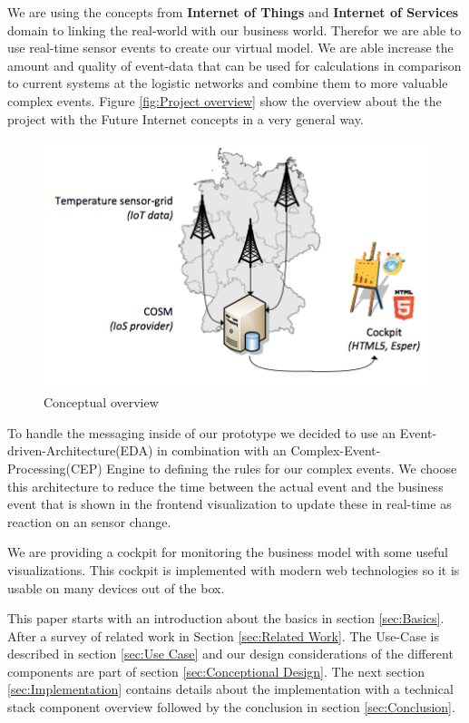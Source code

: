 \documentclass{acm_proc_article-sp}
\begin{document}
We are using the concepts from \textbf{Internet of Things} and \textbf{Internet of Services} domain to linking the real-world with our business world. Therefor we are able to use real-time sensor events to create our virtual model. We are able increase the amount and quality of event-data that can be used for calculations in comparison to current systems at the logistic networks and combine them to more valuable complex events.
Figure \ref{fig:Project overview} show the overview about the the project with the Future Internet concepts in a very general way. 

\begin{figure}[h]
	\begin{center}
		\includegraphics[scale=0.5]{overview.png}
		\caption[Conceptual overview]{Conceptual overview}
		\label{fig:Conceptual overview}
	\end{center}
\end{figure}


To handle the messaging inside of our prototype we decided to use an Event-driven-Architecture(EDA) in combination with an Complex-Event-Processing(CEP) Engine to defining the rules for our complex events. We choose this architecture to reduce the time between the actual event and the business event that is shown in the frontend visualization to update these in real-time as reaction on an sensor change.

We are providing a cockpit for monitoring the business model with some useful visualizations.
This cockpit is implemented with modern web technologies so it is usable on many devices out of the box.

This paper starts with an introduction about the basics in section \ref{sec:Basics}.
After a survey of related work in Section \ref{sec:Related Work}. 
The Use-Case is described in section \ref{sec:Use Case} and our design considerations of the different components are part of section \ref{sec:Conceptional Design}.
The next section \ref{sec:Implementation} contains details about the implementation with a technical stack component overview followed by the conclusion in section \ref{sec:Conclusion}.
\end{document}
